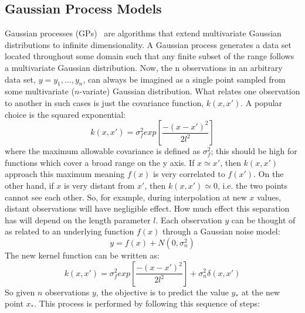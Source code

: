 \subsection{Gaussian Process Models}
\label{sec:GPM}
Gaussian processes (GPs)~\cite{Rasmussen_GPM} are algorithms that extend multivariate Gaussian distributions to infinite dimensionality. A Gaussian process generates a data set located throughout some domain such that any finite subset of the range follows a multivariate Gaussian distribution. Now, the n observations in an arbitrary data set, $y={y_1,\ldots,y_n}$, can always be imagined as a single point sampled from some multivariate ($n$-variate) Gaussian distribution.
What relates one observation to another in such cases is just the covariance function, $k(x,x')$. A popular choice is the squared exponential:
\begin{equation}
k(x,x')=\sigma_{f}^{2}  exp \left [ \frac{-(x-x')^2}{2 l^2} \right ]
\end{equation}
where the maximum allowable covariance is defined as $\sigma_{f}^{2}$; this should be high for functions which cover a broad range on the y axis. If $x \simeq x'$, then $k(x,x')$ approach this maximum meaning $f(x)$ is very correlated to $f(x')$. On the other hand, if $x$ is very distant from $x'$, then $k(x,x' ) \simeq 0$, i.e. the two points cannot see each other. 
So, for example, during interpolation at new $x$ values, distant observations will have negligible effect. How much effect this separation has will depend on the length parameter $l$.
Each observation $y$ can be thought of as related to an underlying function $f(x)$ through a Gaussian noise model:
\begin{equation}
y=f(x)+N(0,\sigma_{n}^{2})
\end{equation}
The new kernel function can be written as:
\begin{equation}
k(x,x')=\sigma_{f}^{2}  exp \left [ \frac{-(x-x')^2}{2 l^2} \right ] + \sigma_{n}^{2} \delta(x,x')
\end{equation}
So given $n$ observations $y$, the objective is to predict the value $y_*$ at the new point $x_*$. This process is performed by following this sequence of steps:
